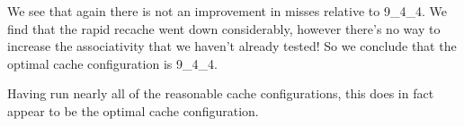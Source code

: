 We see that again there is not an improvement in misses relative to 9\_4\_4. 
We find that the rapid recache went down considerably, however there's no way to increase the associativity that we haven't already tested! So we conclude that the optimal cache configuration is 9\_4\_4.

Having run nearly all of the reasonable cache configurations, this does in fact appear to be the optimal cache configuration.
